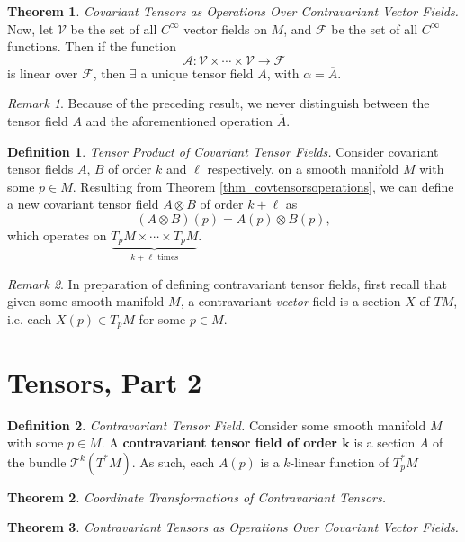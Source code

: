 \documentclass[10pt,landscape]{article}
\theoremstyle{definition}
\newtheorem{definition}{Definition}[section]
\theoremstyle{theorem}
\newtheorem{theorem}{Theorem}[section]
\theoremstyle{summary}
\theoremstyle{remark}
\newtheorem*{remark}{Remark}
\newcommand{\Ci}{C^\infty}
\begin{document}
\begin{multicols*}{3}
\begin{theorem}{\textit{Covariant Tensors as Operations Over Contravariant Vector Fields.}}
    Now, let $\mathcal{V}$ be the set of all $\Ci$ vector fields on $M$, and $\mathcal{F}$ be the set of all $\Ci$ functions. Then if the function
    \begin{equation}
        \mathcal{A}:\mathcal{V}\times\cdots\times\mathcal{V}\rightarrow\mathcal{F}
    \end{equation}
    is linear over $\mathcal{F}$, then $\exists$ a unique tensor field $A$, with $\alpha=\overline{A}$.
\end{theorem}

\begin{remark}
    Because of the preceding result, we never distinguish between the tensor field $A$ and the aforementioned operation $\overline{A}$.
\end{remark}

\theoremstyle{definition}
\begin{definition}{\textit{Tensor Product of Covariant Tensor Fields.}}
    Consider covariant tensor fields $A$, $B$ of order $k$ and $\ell$ respectively, on a smooth manifold $M$ with some $p\in M$. Resulting from Theorem \ref{thm_covtensorsoperations}, we can define a new covariant tensor field $A\otimes B$ of order $k+\ell$ as
    \begin{equation}
        (A\otimes B)(p) = A(p)\otimes B(p),
    \end{equation}
    which operates on $\underbrace{T_pM\times\cdots\times T_pM}_{k+\ell\text{ times}}$.
\end{definition}

\begin{remark}
    In preparation of defining contravariant tensor fields, first recall that given some smooth manifold $M$, a contravariant \textit{vector} field is a section $X$ of $TM$, i.e. each $X(p)\in T_pM$ for some $p\in M$.
\end{remark}

\section{Tensors, Part 2}

\theoremstyle{definition}
\begin{definition}{\textit{Contravariant Tensor Field.}}
    Consider some smooth manifold $M$ with some $p\in M$. A \textbf{contravariant tensor field of order $\bm{k}$} is a section $A$ of the bundle $\mathcal{T}^k(T^*M)$. As such, each $A(p)$ is a $k$-linear function of $T_p^*M$
\end{definition}

\theoremstyle{theorem}
\begin{theorem}{\textit{Coordinate Transformations of Contravariant Tensors.}}
    
\end{theorem}

\theoremstyle{theorem}
\begin{theorem}{\textit{Contravariant Tensors as Operations Over Covariant Vector Fields.}}
\end{theorem}
 
\end{multicols*}
\end{document}
